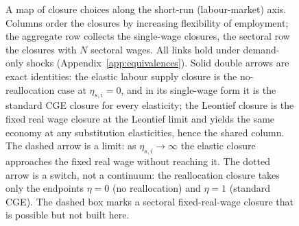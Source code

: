 \begin{figure}[htbp]
\caption{A map of closure choices along the short-run (labour-market)
  axis. Columns order the closures by increasing flexibility of employment;
  the aggregate row collects the single-wage closures, the sectoral row the
  closures with $N$ sectoral wages. All links hold under demand-only shocks
  (Appendix~\ref{app:equivalences}). Solid double arrows are exact
  identities: the elastic labour supply closure is the no-reallocation case
  at $\eta_{s,i} = 0$, and in its single-wage form it is the standard CGE
  closure for every elasticity; the Leontief closure is the fixed real wage
  closure at the Leontief limit and yields the same economy at any
  substitution elasticities, hence the shared column. The dashed arrow is a
  limit: as $\eta_{s,i} \to \infty$ the elastic closure approaches the fixed
  real wage without reaching it. The dotted arrow is a switch, not a
  continuum: the reallocation closure takes only the endpoints $\eta = 0$
  (no reallocation) and $\eta = 1$ (standard CGE). The dashed box marks a
  sectoral fixed-real-wage closure that is possible but not built here.}
\label{fig:flexibility-map-alt}
\end{figure}
